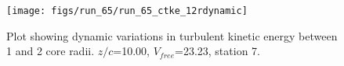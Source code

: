 \begin{figure}[H]
\centering
\texttt{[image: figs/run\_65/run\_65\_ctke\_12rdynamic]}
\caption{Plot showing dynamic variations in turbulent kinetic energy between 1 and 2 core radii. $z/c$=10.00, $V_{free}$=23.23, station 7.}
\label{fig:run_65_ctke_12rdynamic}
\end{figure}


